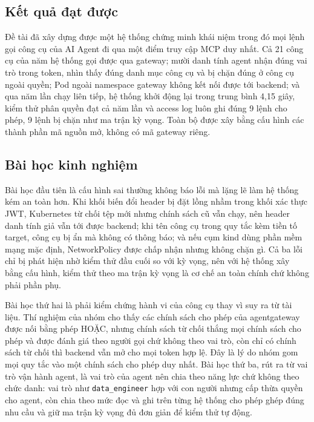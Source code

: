 
\subsection{Kết quả đạt được}

Đề tài đã xây dựng được một hệ thống chứng minh khái niệm trong đó mọi lệnh gọi công cụ của AI Agent đi qua một điểm truy cập MCP duy nhất. Cả 21 công cụ của năm hệ thống gọi được qua gateway; mười danh tính agent nhận đúng vai trò trong token, nhìn thấy đúng danh mục công cụ và bị chặn đúng ở công cụ ngoài quyền; Pod ngoài namespace gateway không kết nối được tới backend; và qua năm lần chạy liên tiếp, hệ thống khởi động lại trong trung bình 4,15 giây, kiểm thử phân quyền đạt cả năm lần và access log luôn ghi đúng 9 lệnh cho phép, 9 lệnh bị chặn như ma trận kỳ vọng. Toàn bộ được xây bằng cấu hình các thành phần mã nguồn mở, không có mã gateway riêng.


\subsection{Bài học kinh nghiệm}

Bài học đầu tiên là cấu hình sai thường không báo lỗi mà lặng lẽ làm hệ thống kém an toàn hơn. Khi khối biến đổi header bị đặt lồng nhầm trong khối xác thực JWT, Kubernetes từ chối tệp mới nhưng chính sách cũ vẫn chạy, nên header danh tính giả vẫn tới được backend; khi tên công cụ trong quy tắc kèm tiền tố target, công cụ bị ẩn mà không có thông báo; và nếu cụm kind dùng phần mềm mạng mặc định, NetworkPolicy được chấp nhận nhưng không chặn gì. Cả ba lỗi chỉ bị phát hiện nhờ kiểm thử đầu cuối so với kỳ vọng, nên với hệ thống xây bằng cấu hình, kiểm thử theo ma trận kỳ vọng là cơ chế an toàn chính chứ không phải phần phụ.

Bài học thứ hai là phải kiểm chứng hành vi của công cụ thay vì suy ra từ tài liệu. Thí nghiệm của nhóm cho thấy các chính sách cho phép của agentgateway được nối bằng phép HOẶC, nhưng chính sách từ chối thắng mọi chính sách cho phép và được đánh giá theo người gọi chứ không theo vai trò, còn chỉ có chính sách từ chối thì backend vẫn mở cho mọi token hợp lệ. Đây là lý do nhóm gom mọi quy tắc vào một chính sách cho phép duy nhất. Bài học thứ ba, rút ra từ vai trò vận hành agent, là vai trò của agent nên chia theo năng lực chứ không theo chức danh: vai trò như \texttt{data\_engineer} hợp với con người nhưng cấp thừa quyền cho agent, còn chia theo mức đọc và ghi trên từng hệ thống cho phép ghép đúng nhu cầu và giữ ma trận kỳ vọng đủ đơn giản để kiểm thử tự động.

